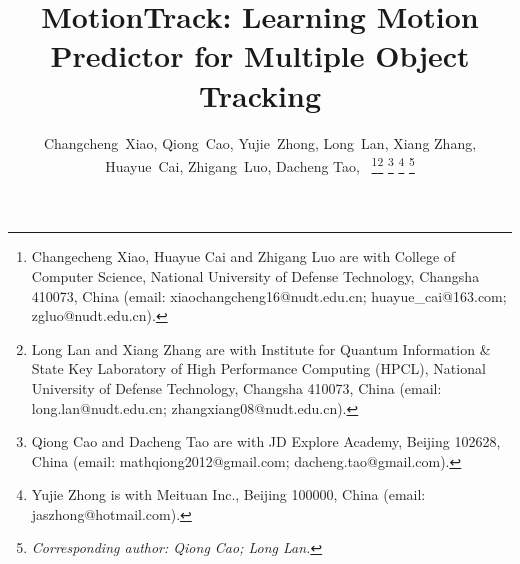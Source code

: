 \documentclass[lettersize,journal]{IEEEtran}
\begin{document}
\title{MotionTrack: Learning Motion Predictor for Multiple Object Tracking}

\author{Changcheng~Xiao, Qiong~Cao, Yujie~Zhong, Long~Lan, Xiang Zhang, Huayue~Cai, Zhigang~Luo, Dacheng Tao,~
\thanks{Changecheng Xiao, Huayue Cai and Zhigang Luo are with College of Computer Science, National University of Defense Technology, Changsha 410073, China (email: xiaochangcheng16@nudt.edu.cn; huayue\_cai@163.com; zgluo@nudt.edu.cn).}\thanks{Long Lan and Xiang Zhang are with Institute for Quantum Information \& State Key Laboratory of High Performance Computing (HPCL), National University of Defense Technology, Changsha 410073, China (email: long.lan@nudt.edu.cn; zhangxiang08@nudt.edu.cn).}
\thanks{Qiong Cao and Dacheng Tao are with JD Explore Academy, Beijing 102628, China (email: mathqiong2012@gmail.com; dacheng.tao@gmail.com).}
\thanks{Yujie Zhong is with Meituan Inc., Beijing 100000, China (email: jaszhong@hotmail.com).}
\thanks{\textit{Corresponding author: Qiong Cao; Long Lan.}}
}

\end{document}
